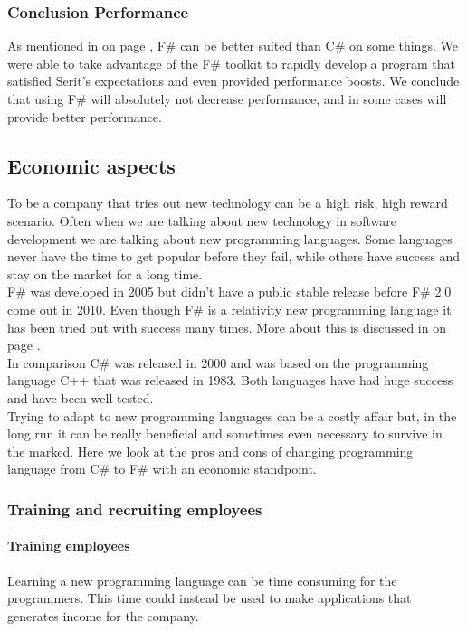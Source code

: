 \documentclass[12pt, a4paper]{article}
\begin{document}
\subsubsection{Conclusion Performance}
As mentioned in  on page \pageref{sTranslatePerformance}, F\# can be better suited than C\# on some things. We were able to take advantage of the F\# toolkit to rapidly develop a program that satisfied Serit's expectations and even provided performance boosts. We conclude that using F\# will absolutely not decrease performance, and in some cases will provide better performance.

\newpage

\subsection{Economic aspects}

To be a company that tries out new technology can be a high risk, high reward scenario. Often when we are talking about new technology in software development we are talking about new programming languages. Some languages never have the time to get popular before they fail, while others have success and stay on the market for a long time.\\

F\# was developed in 2005 but didn't have a public stable release before F\# 2.0 come out in 2010. Even though F\# is a relativity new programming language it has been tried out with success many times. More about this is discussed in  on page \pageref{Testimonials}.\\

In comparison C\# was released in 2000 and was based on the programming language C++ that was released in 1983. Both languages have had huge success and have been well tested.\\

Trying to adapt to new programming languages can be a costly affair but, in the long run it can be really beneficial and sometimes even necessary to survive in the marked. Here we look at the pros and cons of changing programming language from C\# to F\# with an economic standpoint.

\newpage
\subsubsection{Training and recruiting employees}

\paragraph{Training employees}
Learning a new programming language can be time consuming for the programmers. This time could instead be used to make applications that generates income for the company.\\
\end{document}
